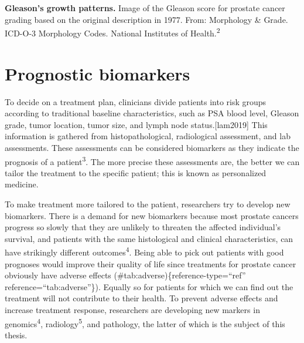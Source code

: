 \documentclass[
  12pt,
  a5,margin=2cmpaper,
]{article}
\begin{document}
\textbf{Gleason's growth patterns.} Image of the Gleason score for
prostate cancer grading based on the original description in 1977. From:
Morphology \& Grade. ICD-O-3 Morphology Codes. National Institutes of
Health.\textsuperscript{2}

\hypertarget{prognostic-biomarkers}{%
\section{Prognostic biomarkers}\label{prognostic-biomarkers}}

To decide on a treatment plan, clinicians divide patients into risk
groups according to traditional baseline characteristics, such as PSA
blood level, Gleason grade, tumor location, tumor size, and lymph node
status.{[}lam2019{]} This information is gathered from
histopathological, radiological assessment, and lab assessments. These
assessments can be considered biomarkers as they indicate the prognosis
of a patient\textsuperscript{3}. The more precise these assessments are,
the better we can tailor the treatment to the specific patient; this is
known as personalized medicine.

To make treatment more tailored to the patient, researchers try to
develop new biomarkers. There is a demand for new biomarkers because
most prostate cancers progress so slowly that they are unlikely to
threaten the affected individual's survival, and patients with the same
histological and clinical characteristics, can have strikingly different
outcomes\textsuperscript{4}. Being able to pick out patients with good
prognoses would improve their quality of life since treatments for
prostate cancer obviously have adverse effects
(\#tab:adverse)\{reference-type=``ref'' reference=``tab:adverse''\}).
Equally so for patients for which we can find out the treatment will not
contribute to their health. To prevent adverse effects and increase
treatment response, researchers are developing new markers in
genomics\textsuperscript{4}, radiology\textsuperscript{5}, and
pathology, the latter of which is the subject of this thesis.

\pagebreak
\end{document}

